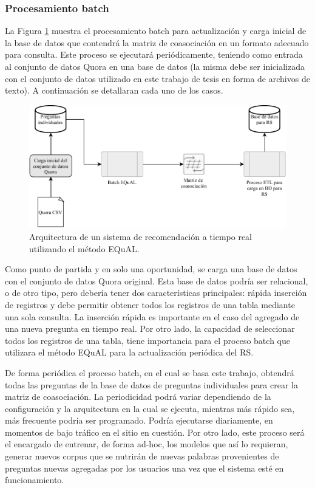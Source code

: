 \subsubsection{Procesamiento batch}
La Figura \ref{fig:implementacionrsbatch} muestra el procesamiento batch para actualización y carga inicial de la base de datos que contendrá la matriz de coasociación en un formato adecuado para consulta. Este proceso se ejecutará periódicamente, teniendo como entrada al conjunto de datos Quora en una base de datos (la misma debe ser inicializada con el conjunto de datos utilizado en este trabajo de tesis en forma de archivos de texto). A continuación se detallaran cada uno de los casos.

\bigskip
\begin{figure}[h!]
	\centering
	\includegraphics[width=0.9\linewidth]{8_problema_investigacion/imagenes/implementacion_rs_batch}
	\caption{Arquitectura de un sistema de recomendación a tiempo real utilizando el método EQuAL.}
	\label{fig:implementacionrsbatch}
\end{figure}

Como punto de partida y en solo una oportunidad, se carga una base de datos con el conjunto de datos Quora original. Esta base de datos podría ser relacional, o de otro tipo, pero debería tener dos características principales: rápida inserción de registros y debe permitir obtener todos los registros de una tabla mediante una sola consulta. La inserción rápida es importante en el caso del agregado de una nueva pregunta en tiempo real. Por otro lado, la capacidad de seleccionar todos los registros de una tabla, tiene importancia para el proceso batch que utilizara el método EQuAL para la actualización periódica del RS.

\bigskip De forma periódica el proceso batch, en el cual se basa este trabajo, obtendrá todas las preguntas de la base de datos de preguntas individuales para crear la matriz de coasociación. La periodicidad podrá variar dependiendo de la configuración y la arquitectura en la cual se ejecuta, mientras más rápido sea, más frecuente podría ser programado. Podría ejecutarse diariamente, en momentos de bajo tráfico en el sitio en cuestión. Por otro lado, este proceso será el encargado de entrenar, de forma ad-hoc, los modelos que así lo requieran, generar nuevos corpus que se nutrirán de nuevas palabras provenientes de preguntas nuevas agregadas por los usuarios una vez que el sistema esté en funcionamiento.

